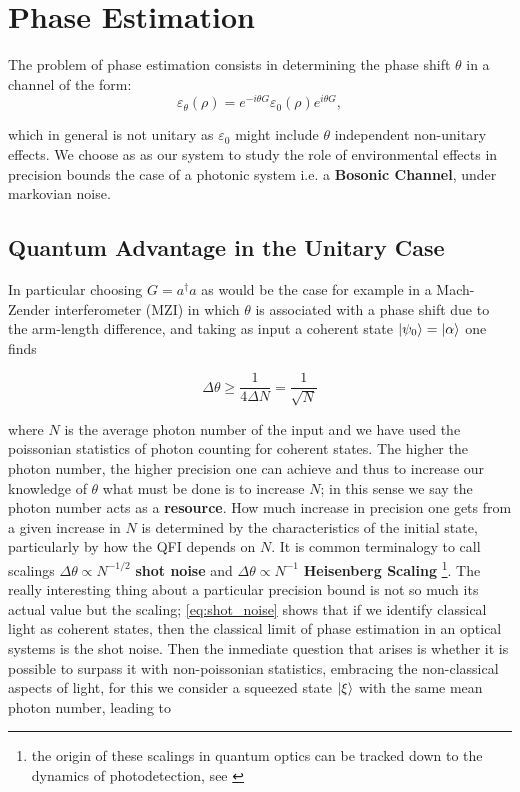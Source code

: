 \section{Phase Estimation}
The problem of phase estimation consists in determining the phase shift $\theta$ in a channel of the form:
\begin{equation}
  \varepsilon_{\theta}(\rho) = e^{-i\theta G}\varepsilon_{0}(\rho)e^{i\theta G},
\end{equation}

which in general is not unitary as $\varepsilon_{0}$ might include $\theta$ independent non-unitary effects. We choose as
as our system to study the role of environmental effects in precision bounds the case of a photonic system i.e. a \textbf{Bosonic Channel},
under markovian noise.
\subsection{Quantum Advantage in the Unitary Case}
In particular choosing $G=a^{\dagger}a$ as would be the case for example in a Mach-Zender interferometer (MZI) in which $\theta$ is associated
with a phase shift due to the arm-length difference, and taking as input a coherent state $\ket{\psi_{0}}=\ket{\alpha}$ one finds

\begin{equation}\label{eq:shot_noise}
\Delta \theta \geq \frac{1}{4\Delta N}=\frac{1}{\sqrt{N}}
\end{equation}

where $N$ is the average photon number of the input and we have used the poissonian statistics of photon counting for coherent states. The
higher the photon number, the higher precision one can achieve and thus to
increase our knowledge of $\theta$ what must be done is to increase $N$; in this sense we say the photon number acts as a \textbf{resource}.
How much increase in precision one gets from a given increase in $N$ is determined by the characteristics of the initial state, particularly
by how the QFI depends on $N$. It is common terminalogy to call scalings $\Delta \theta \propto N^{-1/2}$ \textbf{shot noise} and  $\Delta \theta \propto N^{-1}$ \textbf{Heisenberg Scaling} \cite{barbieri_optical_2022} \footnote{the origin of these scalings in quantum optics can be tracked down to the dynamics of photodetection, see \cite{wiseman_quantum_2010}}. The really interesting thing about
a particular precision bound is not so much its actual value but the scaling; \eqref{eq:shot_noise} shows that if we identify
classical light as coherent states, then the classical limit of phase estimation in an optical systems is the shot noise.
Then the inmediate question that arises is whether it is possible to surpass it with non-poissonian statistics, embracing the non-classical
aspects of light, for this we consider a squeezed state $\ket{\xi}$ with the same mean photon number, leading to

